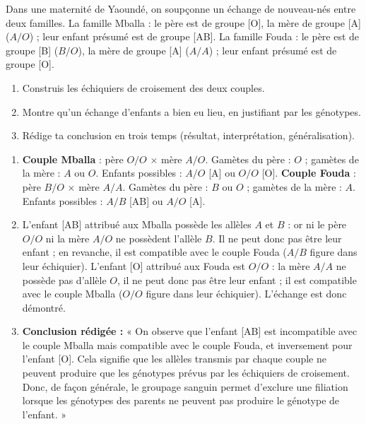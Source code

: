 \documentclass[11pt]{article}
\begin{document}
\begin{exercice}
Dans une maternité de Yaoundé, on soupçonne un échange de nouveau-nés entre deux familles. La famille Mballa : le père est de groupe [O], la mère de groupe [A] ($A/O$) ; leur enfant présumé est de groupe [AB]. La famille Fouda : le père est de groupe [B] ($B/O$), la mère de groupe [A] ($A/A$) ; leur enfant présumé est de groupe [O].
\begin{enumerate}
\item Construis les échiquiers de croisement des deux couples.
\item Montre qu'un échange d'enfants a bien eu lieu, en justifiant par les génotypes.
\item Rédige ta conclusion en trois temps (résultat, interprétation, généralisation).
\end{enumerate}
\end{exercice}

\begin{corrige}
\begin{enumerate}
\item \textbf{Couple Mballa} : père $O/O$ $\times$ mère $A/O$. Gamètes du père : $O$ ; gamètes de la mère : $A$ ou $O$. Enfants possibles : $A/O$ [A] ou $O/O$ [O]. \textbf{Couple Fouda} : père $B/O$ $\times$ mère $A/A$. Gamètes du père : $B$ ou $O$ ; gamètes de la mère : $A$. Enfants possibles : $A/B$ [AB] ou $A/O$ [A].
\item L'enfant [AB] attribué aux Mballa possède les allèles $A$ et $B$ : or ni le père $O/O$ ni la mère $A/O$ ne possèdent l'allèle $B$. Il ne peut donc pas être leur enfant ; en revanche, il est compatible avec le couple Fouda ($A/B$ figure dans leur échiquier). L'enfant [O] attribué aux Fouda est $O/O$ : la mère $A/A$ ne possède pas d'allèle $O$, il ne peut donc pas être leur enfant ; il est compatible avec le couple Mballa ($O/O$ figure dans leur échiquier). L'échange est donc démontré.
\item \textbf{Conclusion rédigée :} « On observe que l'enfant [AB] est incompatible avec le couple Mballa mais compatible avec le couple Fouda, et inversement pour l'enfant [O]. Cela signifie que les allèles transmis par chaque couple ne peuvent produire que les génotypes prévus par les échiquiers de croisement. Donc, de façon générale, le groupage sanguin permet d'exclure une filiation lorsque les génotypes des parents ne peuvent pas produire le génotype de l'enfant. »
\end{enumerate}
\end{corrige}
\end{document}
